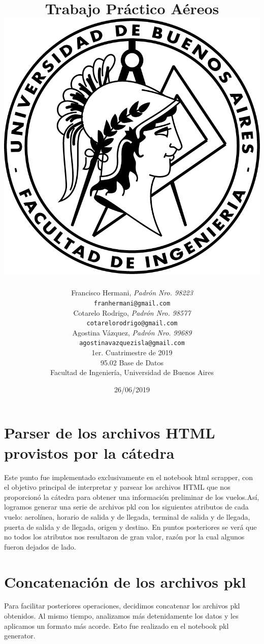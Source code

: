 \documentclass[a4paper,11pt]{article}
\title{\textbf{Trabajo Práctico Aéreos} \\[1cm] \includegraphics[scale=1]{./imagenes/fiuba.png}}
\author{	Francisco Hermani, \textit{Padrón Nro. 98223}                     \\
            \texttt{ franhermani@gmail.com }                                              \\[2.5ex]
            Cotarelo Rodrigo, \textit{Padrón Nro. 98577}                     \\
            \texttt{ cotarelorodrigo@gmail.com }                                              \\[2.5ex]
			Agostina Vázquez, \textit{Padrón Nro. 99689}                    
\\
            \texttt{ agostinavazquezisla@gmail.com }                                              \\[2.5ex]
            \normalsize{1er. Cuatrimestre de 2019}                                      \\
            \normalsize{95.02 Base de Datos}  \\
            \normalsize{Facultad de Ingeniería, Universidad de Buenos Aires}            \\
       }
\date{26/06/2019}
\begin{document}
\maketitle
\thispagestyle{empty}   %
\newpage
{\sffamily\tableofcontents}
\newpage
\section{Parser de los archivos HTML provistos por la cátedra}
Este punto fue implementado exclusivamente en el notebook html scrapper, con el objetivo principal de interpretar y parsear los archivos HTML que nos proporcionó la cátedra para obtener una información preliminar de los vuelos.Así, logramos generar una serie de archivos pkl con los siguientes atributos de cada vuelo: aerolínea, horario de salida y de llegada, terminal de salida y de llegada, puerta de salida y de llegada, origen y destino. En puntos posteriores se verá que no todos los atributos nos resultaron de gran valor, razón por la cual algunos fueron dejados de lado.

\section{Concatenación de los archivos pkl}
Para facilitar posteriores operaciones, decidimos concatenar los archivos pkl obtenidos. Al mismo tiempo, analizamos más detenidamente los datos y les aplicamos un formato más acorde.
Esto fue realizado en el notebook pkl generator.
\end{document}
